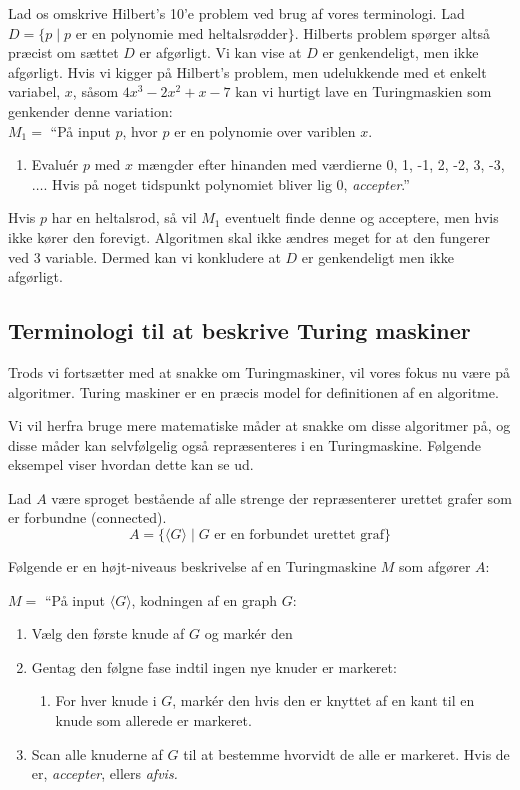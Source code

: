 Lad os omskrive Hilbert's 10'e problem ved brug af vores terminologi. Lad $D = \{p \mid p \text{ er en polynomie med heltalsrødder}\}.$ Hilberts problem spørger altså præcist om sættet $D$ er afgørligt. Vi kan vise at $D$ er genkendeligt, men ikke afgørligt. Hvis vi kigger på Hilbert's problem, men udelukkende med et enkelt variabel, $x$, såsom $4x^{3}-2x^{2}+x-7$ kan vi hurtigt lave en Turingmaskien som genkender denne variation:\\
\noindent
$M_{1} = $ ``På input $p$, hvor $p$ er en polynomie over variblen $x$.
\begin{enumerate}
	\item Evaluér $p$ med $x$ mængder efter hinanden med værdierne 0, 1, -1, 2, -2, 3, -3, $\ldots$. Hvis på noget tidspunkt polynomiet bliver lig 0, \textit{accepter}.''
\end{enumerate}

Hvis $p$ har en heltalsrod, så vil $M_{1}$ eventuelt finde denne og acceptere, men hvis ikke kører den forevigt. Algoritmen skal ikke ændres meget for at den fungerer ved 3 variable. Dermed kan vi konkludere at $D$ er genkendeligt men ikke afgørligt.

\subsection{Terminologi til at beskrive Turing maskiner}%
\label{subsec:terminologiTuringmaskiner}

Trods vi fortsætter med at snakke om Turingmaskiner, vil vores fokus nu være på algoritmer. Turing maskiner er en præcis model for definitionen af en algoritme.

Vi vil herfra bruge mere matematiske måder at snakke om disse algoritmer på, og disse måder kan selvfølgelig også repræsenteres i en Turingmaskine. Følgende eksempel viser hvordan dette kan se ud.

Lad $A$ være sproget bestående af alle strenge der repræsenterer urettet grafer som er forbundne (connected).
\begin{equation*}
	A = \{\langle G \rangle \mid G \text{ er en forbundet urettet graf}\}
\end{equation*}

Følgende er en højt-niveaus beskrivelse af en Turingmaskine $M$ som afgører $A$:

$M = $ ``På input $\langle G \rangle$, kodningen af en graph $G$:
\begin{enumerate}
	\item Vælg den første knude af $G$ og markér den
	\item Gentag den følgne fase indtil ingen nye knuder er markeret:
	      \begin{enumerate}
		      \item For hver knude i $G$, markér den hvis den er knyttet af en kant til en knude som allerede er markeret.
	      \end{enumerate}
	\item Scan alle knuderne af $G$ til at bestemme hvorvidt de alle er markeret. Hvis de er, \textit{accepter}, ellers \textit{afvis.}
\end{enumerate}

